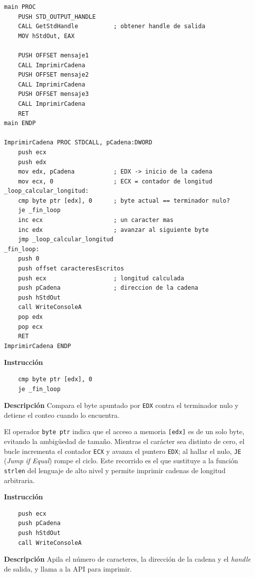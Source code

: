 \documentclass[a4paper,12pt]{article}
\begin{document}
\begin{lstlisting}[style=assemblyStyle, caption={Procedimiento \texttt{ImprimirCadena} e invocación con tres cadenas.}, label={lst:imprimircadena}]
main PROC
    PUSH STD_OUTPUT_HANDLE
    CALL GetStdHandle          ; obtener handle de salida
    MOV hStdOut, EAX

    PUSH OFFSET mensaje1
    CALL ImprimirCadena
    PUSH OFFSET mensaje2
    CALL ImprimirCadena
    PUSH OFFSET mensaje3
    CALL ImprimirCadena
    RET
main ENDP

ImprimirCadena PROC STDCALL, pCadena:DWORD
    push ecx
    push edx
    mov edx, pCadena           ; EDX -> inicio de la cadena
    mov ecx, 0                 ; ECX = contador de longitud
_loop_calcular_longitud:
    cmp byte ptr [edx], 0      ; byte actual == terminador nulo?
    je _fin_loop
    inc ecx                    ; un caracter mas
    inc edx                    ; avanzar al siguiente byte
    jmp _loop_calcular_longitud
_fin_loop:
    push 0
    push offset caracteresEscritos
    push ecx                   ; longitud calculada
    push pCadena               ; direccion de la cadena
    push hStdOut
    call WriteConsoleA
    pop edx
    pop ecx
    RET
ImprimirCadena ENDP
\end{lstlisting}

\begin{instruccionbox}
\textbf{Instrucción}
\begin{lstlisting}
    cmp byte ptr [edx], 0
    je _fin_loop
\end{lstlisting}
\textbf{Descripción}
Compara el byte apuntado por \texttt{EDX} contra el terminador nulo y detiene el conteo cuando lo encuentra.
\end{instruccionbox}

El operador \texttt{byte ptr} indica que el acceso a memoria \texttt{[edx]} es de un solo byte, evitando la ambigüedad de tamaño. Mientras el carácter sea distinto de cero, el bucle incrementa el contador \texttt{ECX} y avanza el puntero \texttt{EDX}; al hallar el nulo, \texttt{JE} (\textit{Jump if Equal}) rompe el ciclo. Este recorrido es el que sustituye a la función \texttt{strlen} del lenguaje de alto nivel y permite imprimir cadenas de longitud arbitraria.

\begin{instruccionbox}
\textbf{Instrucción}
\begin{lstlisting}
    push ecx
    push pCadena
    push hStdOut
    call WriteConsoleA
\end{lstlisting}
\textbf{Descripción}
Apila el número de caracteres, la dirección de la cadena y el \textit{handle} de salida, y llama a la API para imprimir.
\end{instruccionbox}
\end{document}
